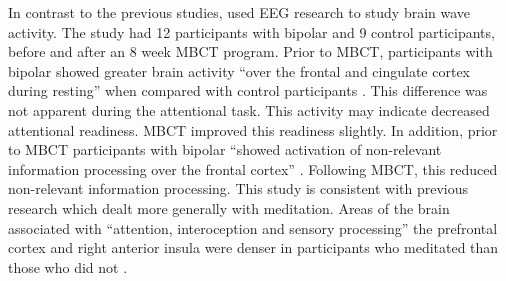 In contrast to the previous studies, \citet{howells_mindfulness_2012} used EEG research to study brain wave activity. The study had 12 participants with bipolar and 9 control participants, before and after an 8 week MBCT program. Prior to MBCT, participants with bipolar showed greater brain activity “over the frontal and cingulate cortex during resting” when compared with control participants \citep{howells_mindfulness_2012}. This difference was not apparent during the attentional task. This activity may indicate decreased attentional readiness. MBCT improved this readiness slightly. In addition, prior to MBCT participants with bipolar “showed activation of non-relevant information processing over the frontal cortex” \citep{howells_mindfulness_2012}. Following MBCT, this reduced non-relevant information processing. This study is consistent with previous research which dealt more generally with meditation. Areas of the brain associated with “attention, interoception and sensory processing” the prefrontal cortex and right anterior insula were denser in participants who meditated than those who did not \citep{lazar_meditation_2005}.
  
  
  